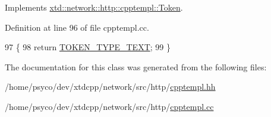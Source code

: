 Implements \hyperlink{classxtd_1_1network_1_1http_1_1cpptempl_1_1Token_afd7dd97138bbac2734e414a406a8e4fe}{xtd\+::network\+::http\+::cpptempl\+::\+Token}.



Definition at line 96 of file cpptempl.\+cc.


\begin{DoxyCode}
97 \{
98   \textcolor{keywordflow}{return} \hyperlink{namespacextd_1_1network_1_1http_1_1cpptempl_a39833083d228a5b5ef9f6bb7896479eeaa3056860c42c00806c737551b598885c}{TOKEN\_TYPE\_TEXT};
99 \}
\end{DoxyCode}


The documentation for this class was generated from the following files\+:\begin{DoxyCompactItemize}
\item 
/home/psyco/dev/xtdcpp/network/src/http/\hyperlink{cpptempl_8hh}{cpptempl.\+hh}\item 
/home/psyco/dev/xtdcpp/network/src/http/\hyperlink{cpptempl_8cc}{cpptempl.\+cc}\end{DoxyCompactItemize}
